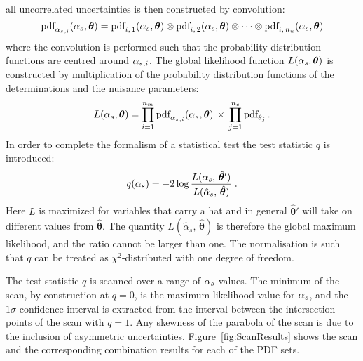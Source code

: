 all uncorrelated uncertainties is then constructed by convolution:
% 
\begin{equation}
\text{pdf}_{ \alpha_s {}_{,i} }(\alpha_s, \bm{\theta}) =
    \text{pdf}_{i,\,1}(\alpha_s, \bm{\theta}) \otimes \text{pdf}_{i,\,2}(\alpha_s, \bm{\theta})
    \otimes \cdots
    \otimes \text{pdf}_{i,\,n_u}(\alpha_s, \bm{\theta})
\end{equation}
% 
where the convolution is performed such that the probability distribution
functions are centred around $\alpha_s{}_{,i}$.
% 
% 
The global likelihood function $L( \alpha_s , \bm{\theta} )$ is constructed
by multiplication of the probability distribution functions of the
determinations and the nuisance parameters:
% 
\begin{equation}
L( \alpha_s , \bm{\theta} ) = 
    \prod_{i=1}^{n_m} \text{pdf}_{ \alpha_s {}_{,i} }(\alpha_s, \bm{\theta})
    \, \times \,
    \prod_{j=1}^{n_c} \text{pdf}_{\theta_j}
    \,.
    \label{eq:globallikelihoodfunction}
\end{equation}
% 
In order to complete the formalism of a statistical test the test
statistic $q$ is introduced:
%
\begin{equation}
q( \alpha_s ) = -2 \log \frac{ L( \alpha_s ,\, \hat{\bm{\theta}}' ) }{ L( \hat{\alpha}_s ,\, \hat{\bm{\theta}} ) }
\;.
\end{equation}
% 
Here $L$ is maximized for variables that carry a hat and in general
$\hat{\bm{\theta}}'$ will take on different values from
$\hat{\bm{\theta}}$.
%
The quantity $L( \hat{\alpha}_s ,\, \hat{\bm{\theta}} )$ is therefore
the global maximum likelihood, and the ratio cannot be larger than
one. 
%
The normalisation is such
that $q$ can be treated as $\chi^2$-distributed with one degree of
freedom.

The test statistic $q$ is scanned over a range of $\alpha_s$ values. The
minimum of the scan, by construction at $q=0$, is the maximum
likelihood value for $\alpha_s$, and the $1\sigma$ confidence interval is
extracted from the interval between the intersection points of the
scan with $q=1$. Any skewness of the parabola of the scan is due to
the inclusion of asymmetric uncertainties.
Figure~\ref{fig:ScanResults} shows the scan and the corresponding
combination results for each of the PDF sets. 

